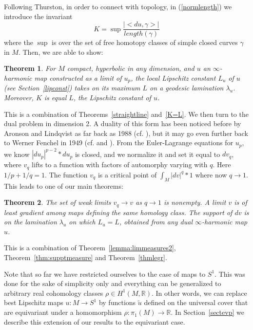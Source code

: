 \documentclass{ip-journal}
\newtheorem{theorem}{Theorem}[section]
\theoremstyle{definition}
\numberwithin{equation}{section}
\newcommand{\R}{\mathbb R}
\begin{document}
Following Thurston, in order to connect  with topology, in (\ref{normlength}) we introduce the invariant
 \begin{equation}\label{defKref}
  K= \sup  \frac{|<du,\gamma>|}{length(\gamma)}
\end{equation} 
 where  the $\sup$ is over  the set of free homotopy classes of simple closed curves  $\gamma$ in $M$.
Then, we are able to show:
 \begin{theorem}\label{Theorem 1.1} For $M$ compact, hyperbolic in any dimension, and $u$ an $\infty$-harmonic map constructed as a limit of $u_p$,  the local Lipschitz constant $L_u$ of $u$ (see Section~\ref{lipconst}) takes on its maximum $L$ on a geodesic lamination $\lambda_u$. Moreover, $ K$ is equal $L$, the Lipschitz constant of $u$.
 \end{theorem}
 

This is a combination of Theorems~\ref{straightline} and~\ref{K=L}.
We then turn to the dual problem in dimension 2.  A  duality of this form has been noticed before by Aronson and Lindqvist as far back as 1988 (cf. \cite{aronsonlin}), but it may go even further  back to Werner Fenchel in 1949 (cf. \cite[p.81-82]{temam} and \cite{fenchel}).  From the Euler-Lagrange equations for $u_p$, we know $|du_p|^{p-2}*du_p$ is closed, and we normalize it and set it equal to $dv_q$, where $v_q$ lifts to a function with factors of automorphy varying with $q$. Here $1/p + 1/q = 1$. The function $v_q$ is a critical point of $\int_M |dv|^q*1$ where now $q \rightarrow 1$. This leads to one of our main theorems:
\begin{theorem}\label{Theorem 1.2}
 The set of weak limits $v_q \rightarrow v$ as $q \rightarrow 1$ is nonempty. A limit $v$ is  of least gradient  among maps defining the same homology class. The support of $dv$ is on the  lamination $\lambda_u$  on which $L_u = L$,  obtained from any dual $\infty$-harmonic map $u$.
\end{theorem}
This is a combination of Theorem~\ref{lemma:limmeasures2}, Theorem~\ref{thm:supptmeasure} and  Theorem~\ref{thmlegr}.

Note that so far we have restricted ourselves to the case of maps to $S^1$. This was done for the sake of simplicity only and everything can be generalized to arbitrary real cohomology classes $\rho \in H^1(M, \R)$. In other words, we can replace best Lipschitz maps $u: M \rightarrow S^1$ by functions $\tilde u$ defined on the universal cover that are equivariant under a homomorphism $\rho:\pi_1(M) \rightarrow \R$. In Section~\ref{sectevp} we describe this extension of our results to the equivariant case.
\end{document}
